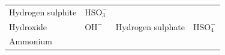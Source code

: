 {\begin{center}
\begin{xtabular*}{\mytablewidth}[t]{|p{10\mystarwidth}|p{10\mystarwidth}|p{10\mystarwidth}|p{10\mystarwidth}|}
    
        Hydrogen sulphite &
    
    
        \begin{math}\mathrm{HSO}_{3}^{-}\end{math}%
     \tabularnewline{}
    
    
        Hydroxide &
    
    
        \begin{math}{\mathrm{OH}}^{-}\end{math} &
    
    
        Hydrogen sulphate &
    
    
        \begin{math}\mathrm{HSO}_{4}^{-}\end{math}%
     \tabularnewline{}
    
    
        Ammonium &
    

\end{xtabular*}
\end{center}}
